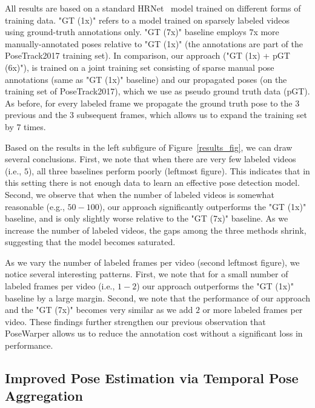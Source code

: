 \documentclass{article}
\begin{document}
All results are based on a standard HRNet~\cite{sun2019deep} model trained on different forms of training data. "GT (1x)" refers to a model trained on sparsely labeled videos using ground-truth annotations only. "GT (7x)" baseline employs $7$x more manually-annotated poses relative to "GT (1x)" (the annotations are part of the PoseTrack2017 training set). In comparison, our approach ("GT (1x) + pGT (6x)"), is trained on a joint training set consisting of sparse manual pose annotations (same as  "GT (1x)" baseline) and our propagated poses (on the training set of PoseTrack2017), which we use as pseudo ground truth data (pGT). As before, for every labeled frame we propagate the ground truth pose to the $3$ previous and the $3$ subsequent frames, which allows us to expand the training set by $7$ times. 
 








Based on the results in the left subfigure of Figure~\ref{results_fig}, we can draw several conclusions. First, we note that when there are very few labeled videos (i.e., $5$), all three baselines perform poorly (leftmost figure). This indicates that in this setting there is not enough data to learn an effective pose detection model. Second, we observe that when the number of labeled videos is somewhat reasonable (e.g., $50-100$), our approach significantly outperforms the "GT (1x)" baseline, and is only slightly worse relative to the "GT (7x)" baseline. As we increase the number of labeled videos, the gaps among the three methods shrink, suggesting that the model becomes saturated.



As we vary the number of labeled frames per video (second leftmost figure), we notice several interesting patterns. First, we note that for a small number of labeled frames per video (i.e., $1-2$) our approach outperforms the "GT (1x)" baseline by a large margin. Second, we note that the performance of our approach and the "GT (7x)" becomes very similar as we add $2$ or more labeled frames per video. These findings further strengthen our previous observation that PoseWarper allows us to reduce the annotation cost without a significant loss in performance.







\subsection{Improved Pose Estimation via Temporal Pose Aggregation}
\end{document}

